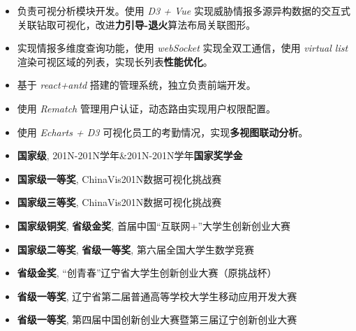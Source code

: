\documentclass[10pt,a4paper]{altacv}
\begin{document}
\begin{CJK}{UTF8}{gbsn}
\divider

\begin{itemize}
\item 负责可视分析模块开发。使用 \textit{D3 + Vue}  实现威胁情报多源异构数据的交互式关联钻取可视化，改进\textbf{力引导-退火}算法布局关联图形。
\item 实现情报多维度查询功能，使用 \textit{webSocket} 实现全双工通信，使用 \textit{virtual list} 渲染可视区域的列表，实现长列表\textbf{性能优化}。
\end{itemize}

\divider

\begin{itemize}
\item 基于 \textit{react+antd} 搭建的管理系统，独立负责前端开发。
\item 使用 \textit{Rematch} 管理用户认证，动态路由实现用户权限配置。
\item 使用 \textit{Echarts + D3} 可视化员工的考勤情况，实现\textbf{多视图联动分析}。
\end{itemize}

\medskip


\begin{CJK}{UTF8}{gkai}
\end{CJK}

\begin{itemize}
\item \textbf{国家级}, 201N-201N学年\&201N-201N学年\textbf{国家奖学金}
\item \textbf{国家级一等奖}, ChinaVis201N数据可视化挑战赛
\item \textbf{国家级三等奖}, ChinaVis201N数据可视化挑战赛
\item \textbf{国家级铜奖}, \textbf{省级金奖}, 首届中国“互联网+”大学生创新创业大赛
\item \textbf{国家级二等奖}, \textbf{省级一等奖}, 第六届全国大学生数学竞赛
\item \textbf{省级金奖}, “创青春”辽宁省大学生创新创业大赛（原挑战杯）
\item \textbf{省级一等奖}, 辽宁省第二届普通高等学校大学生移动应用开发大赛
\item \textbf{省级一等奖}, 第四届中国创新创业大赛暨第三届辽宁创新创业大赛
\end{itemize}

\end{CJK}
\end{document}
